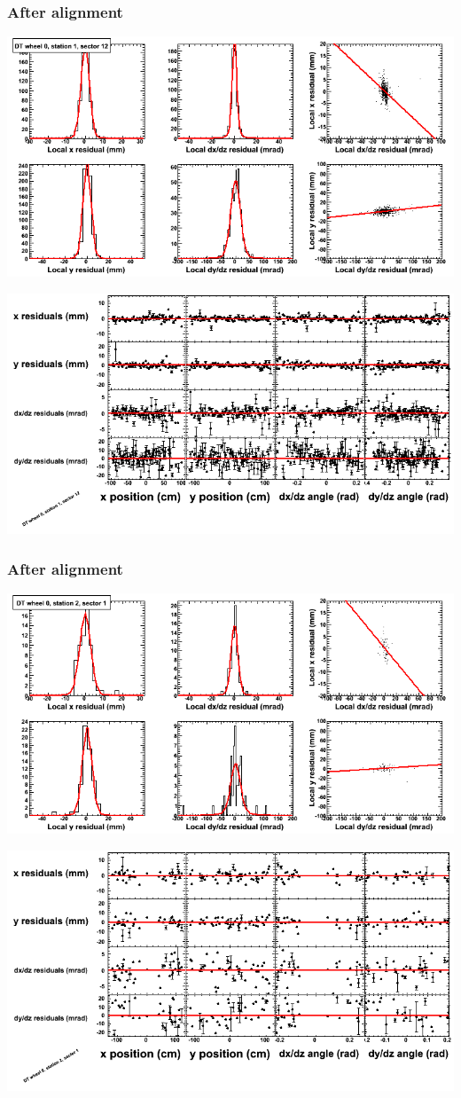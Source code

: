 \documentclass[compress]{beamer}
\begin{document}
\begin{frame}
\frametitle{After alignment}
\includegraphics[width=0.7\linewidth]{NOV4_fitfunctions/MBwhCst1sec12_bellcurves.png}

\includegraphics[width=0.7\linewidth]{NOV4_fitfunctions/MBwhCst1sec12_polynomials.png}
\end{frame}

\begin{frame}
\frametitle{After alignment}
\includegraphics[width=0.7\linewidth]{NOV4_fitfunctions/MBwhCst2sec01_bellcurves.png}

\includegraphics[width=0.7\linewidth]{NOV4_fitfunctions/MBwhCst2sec01_polynomials.png}
\end{frame}
\end{document}
